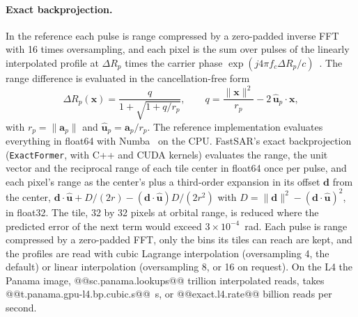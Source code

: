 \documentclass[11pt]{article}
\begin{document}
\paragraph{Exact backprojection.} In the reference each pulse is range compressed by a zero-padded inverse FFT with 16 times oversampling, and each pixel is the sum over pulses of the linearly interpolated profile at $\Delta R_p$ times the carrier phase $\exp(j 4\pi f_c \Delta R_p / c)$~\cite{gorham2010}. The range difference is evaluated in the cancellation-free form
\begin{equation}
\Delta R_p(\mathbf{x}) = \frac{q}{1 + \sqrt{1 + q / r_p}}, \qquad q = \frac{\lVert\mathbf{x}\rVert^2}{r_p} - 2\, \hat{\mathbf{u}}_p \cdot \mathbf{x},
\end{equation}
with $r_p = \lVert\mathbf{a}_p\rVert$ and $\hat{\mathbf{u}}_p = \mathbf{a}_p / r_p$. The reference implementation evaluates everything in float64 with Numba~\cite{lam2015} on the CPU. FastSAR's exact backprojection (\texttt{ExactFormer}, with C++ and CUDA kernels) evaluates the range, the unit vector and the reciprocal range of each tile center in float64 once per pulse, and each pixel's range as the center's plus a third-order expansion in its offset $\mathbf{d}$ from the center, $\mathbf{d}\cdot\hat{\mathbf{u}} + D/(2r) - (\mathbf{d}\cdot\hat{\mathbf{u}})D/(2r^2)$ with $D = \lVert\mathbf{d}\rVert^2 - (\mathbf{d}\cdot\hat{\mathbf{u}})^2$, in float32. The tile, 32 by 32 pixels at orbital range, is reduced where the predicted error of the next term would exceed $3\times10^{-4}$~rad. Each pulse is range compressed by a zero-padded FFT, only the bins its tiles can reach are kept, and the profiles are read with cubic Lagrange interpolation (oversampling 4, the default) or linear interpolation (oversampling 8, or 16 on request). On the L4 the Panama image, @@sc.panama.lookups@@ trillion interpolated reads, takes @@t.panama.gpu-l4.bp.cubic.s@@~s, or @@exact.l4.rate@@ billion reads per second.
\end{document}
